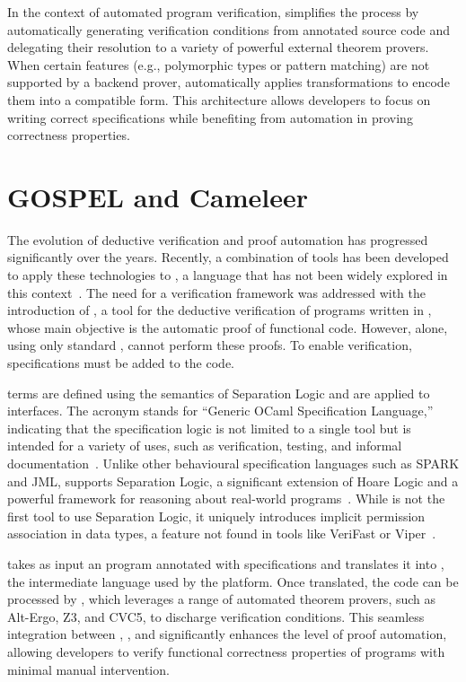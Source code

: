 In the context of automated program verification, \whythree simplifies the process by automatically generating verification 
conditions from annotated source code and delegating their resolution to a variety of powerful external theorem provers. 
When certain features (e.g., polymorphic types or pattern matching) are not supported by a backend prover, \whythree automatically 
applies transformations to encode them into a compatible form. This architecture allows developers to focus on writing 
correct specifications while benefiting from automation in proving correctness properties.~\cite{boogie11why3}

\section{GOSPEL and Cameleer}
\label{sec:Cameleer}

The evolution of deductive verification and proof automation has progressed significantly over the years. Recently, a 
combination of tools has been developed to apply these technologies to \ocaml, a language that has not been widely explored in 
this context~\cite{PereiraR20}. The need for a verification framework was addressed with the introduction of \cameleer, a tool 
for the deductive verification of programs written in \ocaml, whose main objective is the automatic proof of functional code. 
However, \cameleer alone, using only standard \ocaml, cannot perform these proofs. To enable verification, \gospel specifications 
must be added to the \ocaml code.

\gospel terms are defined using the semantics of Separation Logic and are applied to \ocaml interfaces. The acronym \gospel stands 
for “Generic OCaml Specification Language,” indicating that the specification logic is not limited to a single tool but is intended 
for a variety of uses, such as verification, testing, and informal documentation~\cite{ChargueraudFLP19}. Unlike other behavioural 
specification languages such as \textsf{SPARK} and \textsf{JML}, \gospel supports Separation Logic, a significant extension of Hoare 
Logic and a powerful framework for reasoning about real-world programs~\cite{Reynolds02, OHearnRY01}. While \gospel is not the first 
tool to use Separation Logic, it uniquely introduces implicit permission association in data types, a feature not found in tools 
like \textsf{VeriFast} or \textsf{Viper}~\cite{ChargueraudFLP19}.

\cameleer takes as input an \ocaml program annotated with \gospel specifications and translates it into \whyml, the intermediate 
language used by the \whythree platform. Once translated, the code can be processed by \whythree, which leverages a range of automated 
theorem provers, such as Alt-Ergo, Z3, and CVC5, to discharge verification conditions. This seamless integration between \cameleer, 
\gospel, and \whythree significantly enhances the level of proof automation, allowing developers to verify functional correctness 
properties of \ocaml programs with minimal manual intervention.

